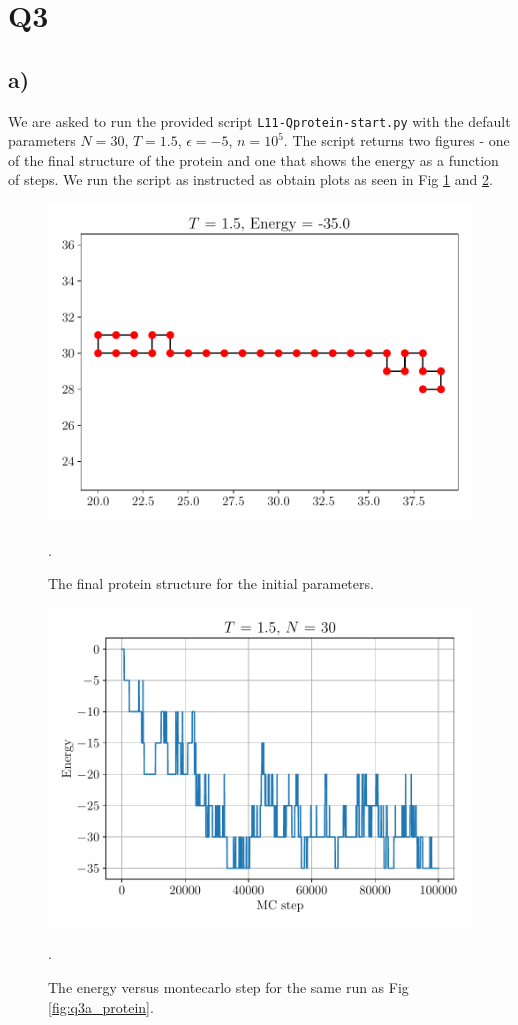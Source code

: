 \documentclass{article}
\begin{document}
\section*{Q3}


\subsection*{a)}
We are asked to run the provided script \texttt{L11-Qprotein-start.py} with the default parameters $N = 30$, $T =1.5$, $\epsilon = -5$, $n = 10^5$. The script returns two figures - one of the final structure of the protein and one that shows the energy as a function of steps. We run the script as instructed as obtain plots as seen in Fig \ref{fig:q3a_protein1} and \ref{fig:q3a_energy1}. \\
\begin{figure}[h!]
    \centerline{\includegraphics[scale=0.6]{images/Q3a_final_protein_T15_N30_n100000.pdf}}
    \caption{The final protein structure for the initial parameters. }.
    \label{fig:q3a_protein1}
\end{figure}
\begin{figure}[h!]
    \centerline{\includegraphics[scale=0.6]{images/Q3a_energy_vs_step_T15_N30_n100000.pdf}}
    \caption{The energy versus montecarlo step for the same run as Fig \ref{fig:q3a_protein}. }.
    \label{fig:q3a_energy1}
\end{figure}
\end{document}
